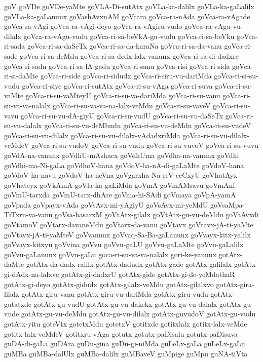 {goV
goVDe
goVDe-yaMte
goVLA-Di-sutAtx
goVLa-ka-dalilx
goVLa-ka-gaLalilx
goVLa-ka-gaLanunx
goVashAvxnAM
goVcara
goVca-ra-nAda
goVca-ra-vAgade
goVca-ra-vAgi
goVca-ra-vAgi-deyo
goVca-ra-vAgiru-vudo
goVca-ra-vAgu-vu-dilalx
goVca-ra-vAgu-vudu
goVca-ri-sa-beVkA-gu-vudu
goVca-ri-sa-beVku
goVca-ri-sada
goVca-ri-sa-daSeTx
goVca-ri-sa-da-karaNa
goVca-ri-sa-da-vanu
goVca-ri-sade
goVca-ri-sa-deMdu
goVca-ri-sa-dedx-lalx-vanunx
goVca-ri-sa-di-dadxre
goVca-ri-sadu
goVca-ri-sa-lA-gadu
goVca-ri-sanu
goVca-risi
goVca-ri-sida
goVca-ri-si-daMte
goVca-ri-side
goVca-ri-sidudx
goVca-ri-siru-vu-dariMda
goVca-ri-si-su-vudu
goVca-ri-siye
goVca-ri-sutAtx
goVca-ri-su-vAga
goVca-ri-suva
goVca-ri-su-vaMte
goVca-ri-su-vaMteyU
goVca-ri-su-va-dariMda
goVca-ri-su-vanu
goVca-ri-su-va-va-nalalx
goVca-ri-su-va-va-na-lalx-veMdu
goVca-ri-su-vaveV
goVca-ri-su-vavu
goVca-ri-su-vu-dA-giyU
goVca-ri-su-vudU
goVca-ri-su-vu-daSeTx
goVca-ri-su-vu-dalalx
goVca-ri-su-vu-deMbudu
goVca-ri-su-vu-deMdu
goVca-ri-su-vudeV
goVca-ri-su-vu-dilalx
goVca-ri-su-vu-dilalx-vAdadxriMda
goVca-ri-su-vu-dilalx-veMdeV
goVca-ri-su-vudoV
goVca-ri-su-vudu
goVca-ri-su-vuvoV
goVca-ri-su-vuvu
goVdA-na-vanunx
goVdhU-mAshacx
goVdhUma
goVdha-na-vanunx
goVdhi
goVdhi-ma-Ni-gaLa
goVdhoV-hana
goVdoV-ha-nA-di-gaLaMte
goVdoV-hana
goVdoV-ha-navu
goVdoV-ha-neVna
goVgarxha-Na-reV-ceCxyU
goVhatAyx
goVhateyx
goVkAmA
goVla-ka-gaLiMda
goVmA
goVmAMsavu
goVmAnf
goVmU-tarxda
goVmU-tarx-dhAre
goVma-hi-SAdi
goVmaya
goVpA-yamA
goVpada
goVpayx-vAda
goVsAvx-mi-yAgiyU
goVsAvx-mi-yeMdU
goVsaMpa-TiTxru-va-vanu
goVsa-hasarxM
goVtAtx-gilalx
goVtAtx-gu-vu-deMdu
goVtAvxdi
goVtamoV
goVtarx-davaneMdu
goVtarx-da-vanu
goVtavx
goVtavx-jA-ti-yaMte
goVtavx-jA-ti-yaMteV
goVvanunx
goVvaq-Sa-Ba-gaLanunx
goVvayx-kitx-yalilx
goVvayx-kitxyu
goVvina
goVvu
goVvu-gaLU
goVvu-gaLaMte
goVvu-gaLalilx
goVvu-gaLanunx
goVvu-gaLu
goca-ri-su-va-va-nalalx
gori-ke-yanunx
gotAtx-daMte
gotAtx-da-dadx-ralilx
gotAtx-dadudx
gotAtx-gade
gotAtx-galilalx
gotAtx-gi-dAdx-na-lalxve
gotAtx-gi-dadxrU
gotAtx-gide
gotAtx-gi-de-yeMdathaR
gotAtx-gi-deyo
gotAtx-gidudx
gotAtx-gilalx-veMdu
gotAtx-gilalxvo
gotAtx-gira-lilalx
gotAtx-giru-vanu
gotAtx-giru-vu-dariMda
gotAtx-giru-vudu
gotAtx-gutatxde
gotAtx-gu-vudU
gotAtx-gu-vu-dakekx
gotAtx-gu-vu-dalalx
gotAtx-gu-vude
gotAtx-gu-vu-deMdu
gotAtx-gu-vu-dilalx
gotAtx-guvudoV
gotAtx-gu-vudu
gotAtx-yitu
goteVtx
gotetxMdu
gotetxV
gotitxde
gotitxlalx
gotitx-lalx-veMde
gotitx-lalx-veMdeV
gotitxru-vAga
gotutx
gotutx-paDisalu
gotutx-paDisuva
guDA-di-gaLa
guDAra
guDu-gina
guDu-gi-niMda
guLeLx-gaLa
guLeLx-gaLu
guMBa
guMBa-dalUlx
guMBa-dalilx
guMBaveV
guMpige
guMpu
guNA-tiVta
}
